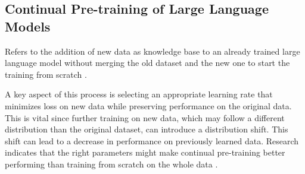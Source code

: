 \subsection{Continual Pre-training of Large Language Models}
Refers to the addition of new data as knowledge base to an already trained large language model without merging the old dataset and the new one to start the training from scratch \cite{gupta2023continual}.

A key aspect of this process is selecting an appropriate learning rate that minimizes loss on new data while preserving performance on the original data. This is vital since further training on new data, which may follow a different distribution than the original dataset, can introduce a distribution shift. This shift can lead to a decrease in performance on previously learned data. Research indicates that the right parameters might make continual pre-training better performing than training from scratch on the whole data \cite{gupta2023continual}.